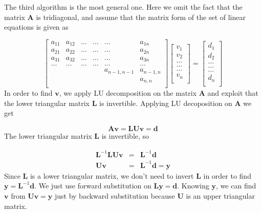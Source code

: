 \documentclass[11pt]{article}
\begin{document}
\vspace{4mm}
\noindent
The third algorithm is the most general one. Here we omit the fact that the matrix $\mathbf{A}$
is tridiagonal, and assume that the matrix form of the set of linear equations is given as

\[
\begin{bmatrix}
    a_{11} & a_{12} & \dots   &\dots & \dots & a_{1n} \\
    a_{21} & a_{22} & \dots & \dots& \dots & a_{2n} \\
     a_{31} & a_{32} & \dots  & \dots & \dots & a_{3n} \\
    \dots &\dots&\dots &\dots  &\dots & \dots \\
     & &  & &a_{n-1, n-1} &a_{n-1,n} \\
     &    &  &  &  & a_{n,n} \\
\end{bmatrix}
\begin{bmatrix}
      v_1\\
      v_2\\
      \dots \\
      \dots  \\
      \dots \\
      v_n\\
\end{bmatrix}
=\begin{bmatrix}
      d_1\\
      d_2\\
      \dots \\
      \dots \\
      \dots \\
      d_n\\
\end{bmatrix}
\]
In order to find $\mathbf{v}$, we apply LU decomposition on the matrix $\mathbf{A}$ and exploit
that the lower triangular matrix $\mathbf{L}$ is invertible. Applying LU decoposition on
$\mathbf{A}$ we get

\begin{equation*}
\mathbf{Av} = \mathbf{LUv} = \mathbf{d}
\end{equation*}
The lower triangular matrix $\mathbf{L}$ is invertible, so

\begin{eqnarray*}
\mathbf{L}^{-1}\mathbf{LUv} &=& \mathbf{L}^{-1}\mathbf{d}\\
\mathbf{Uv} &=& \mathbf{L}^{-1}\mathbf{d} = \mathbf{y}
\end{eqnarray*}
Since $\mathbf{L}$ is a lower triangular matrix, we don't need to invert $\mathbf{L}$ in order to
find $\mathbf{y} = \mathbf{L}^{-1}\mathbf{d}$. We just use forward substitution
on $\mathbf{Ly} = \mathbf{d}$. Knowing $\mathbf{y}$, we can find $\mathbf{v}$
from $\mathbf{Uv} = \mathbf{y}$ just by backward substitution because $\mathbf{U}$ is an upper triangular
matrix.
\end{document}
